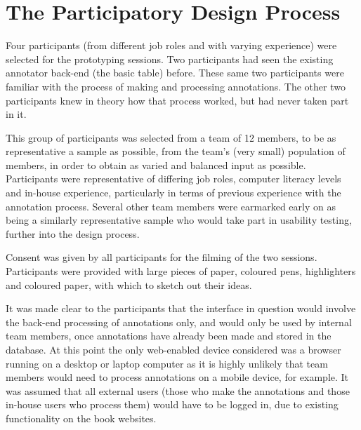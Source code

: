 
\chapter{The Participatory Design Process} %

\label{The Participatory Design Process} %





Four participants (from different job roles and with varying experience) were selected for the prototyping sessions. Two participants had seen the existing annotator back-end (the basic table) before. These same two participants were familiar with the process of making and processing annotations. The other two participants knew in theory how that process worked, but had never taken part in it. 

This group of participants was selected from a team of 12 members, to be as representative a sample as possible, from the team's (very small) population of members, in order to obtain as varied and balanced input as possible. Participants were representative of differing job roles, computer literacy levels and in-house experience, particularly in terms of previous experience with the annotation process. Several other team members were earmarked early on as being a similarly representative sample who would take part in usability testing, further into the design process.

Consent was given by all participants for the filming of the two sessions. Participants were provided with large pieces of paper, coloured pens, highlighters and coloured paper, with which to sketch out their ideas. 

It was made clear to the participants that the interface in question would involve the back-end processing of annotations only, and would only be used by internal team members, once annotations have already been made and stored in the database. At this point the only web-enabled device considered was a browser running on a desktop or laptop computer as it is highly unlikely that team members would need to process annotations on a mobile device, for example. It was assumed that all external users (those who make the annotations and those in-house users who process them) would have to be logged in, due to existing functionality on the book websites.

